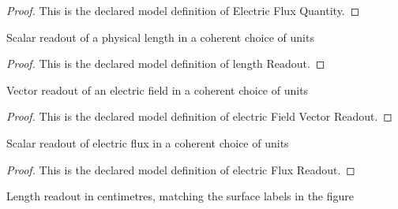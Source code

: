 \begin{proof}
  This is the declared model definition of Electric Flux Quantity.
\end{proof}
\begin{definition}
  \label{def:physics:phyx-mini-0843:phyxminiproblems-problemphyxmini0843-lengthreadout}
  Scalar readout of a physical length in a coherent choice of units
\end{definition}
\begin{proof}
  This is the declared model definition of length Readout.
\end{proof}
\begin{definition}
  \label{def:physics:phyx-mini-0843:phyxminiproblems-problemphyxmini0843-electricfieldvectorreadout}
  Vector readout of an electric field in a coherent choice of units
\end{definition}
\begin{proof}
  This is the declared model definition of electric Field Vector Readout.
\end{proof}
\begin{definition}
  \label{def:physics:phyx-mini-0843:phyxminiproblems-problemphyxmini0843-electricfluxreadout}
  Scalar readout of electric flux in a coherent choice of units
\end{definition}
\begin{proof}
  This is the declared model definition of electric Flux Readout.
\end{proof}
\begin{definition}
  \label{def:physics:phyx-mini-0843:phyxminiproblems-problemphyxmini0843-lengthincentimeters}
  Length readout in centimetres, matching the surface labels in the figure
\end{definition}

